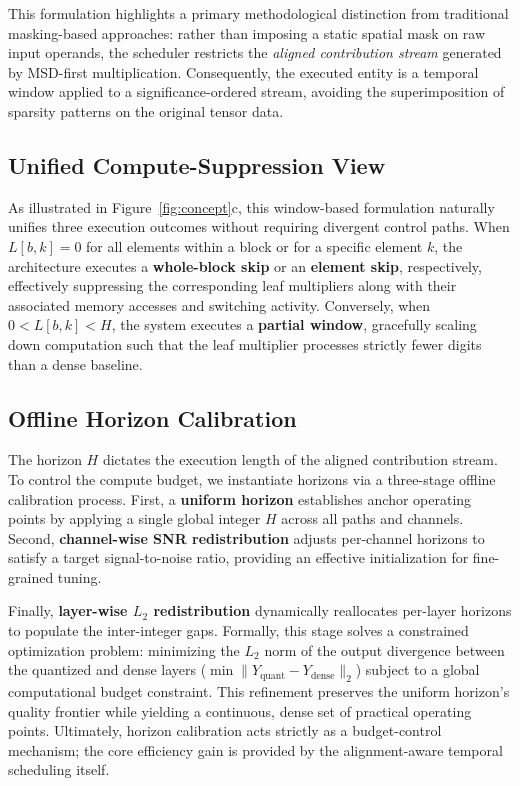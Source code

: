 \documentclass[sigconf]{acmart}
\begin{document}
This formulation highlights a primary methodological distinction from traditional masking-based approaches: rather than imposing a static spatial mask on raw input operands, the scheduler restricts the \emph{aligned contribution stream} generated by MSD-first multiplication. Consequently, the executed entity is a temporal window applied to a significance-ordered stream, avoiding the superimposition of sparsity patterns on the original tensor data.

\subsection{Unified Compute-Suppression View}
\label{sec:unified}

As illustrated in Figure~\ref{fig:concept}c, this window-based formulation naturally unifies three execution outcomes without requiring divergent control paths. When $L[b,k]=0$ for all elements within a block or for a specific element $k$, the architecture executes a \textbf{whole-block skip} or an \textbf{element skip}, respectively, effectively suppressing the corresponding leaf multipliers along with their associated memory accesses and switching activity. Conversely, when $0 < L[b,k] < H$, the system executes a \textbf{partial window}, gracefully scaling down computation such that the leaf multiplier processes strictly fewer digits than a dense baseline.

\subsection{Offline Horizon Calibration}
\label{sec:horizon}

The horizon $H$ dictates the execution length of the aligned contribution stream. To control the compute budget, we instantiate horizons via a three-stage offline calibration process. First, a \textbf{uniform horizon} establishes anchor operating points by applying a single global integer $H$ across all paths and channels. Second, \textbf{channel-wise SNR redistribution} adjusts per-channel horizons to satisfy a target signal-to-noise ratio, providing an effective initialization for fine-grained tuning.

Finally, \textbf{layer-wise $L_2$ redistribution} dynamically reallocates per-layer horizons to populate the inter-integer gaps. Formally, this stage solves a constrained optimization problem: minimizing the $L_2$ norm of the output divergence between the quantized and dense layers ($\min \| Y_{\mathrm{quant}} - Y_{\mathrm{dense}} \|_2$) subject to a global computational budget constraint. This refinement preserves the uniform horizon's quality frontier while yielding a continuous, dense set of practical operating points. Ultimately, horizon calibration acts strictly as a budget-control mechanism; the core efficiency gain is provided by the alignment-aware temporal scheduling itself.
\end{document}
